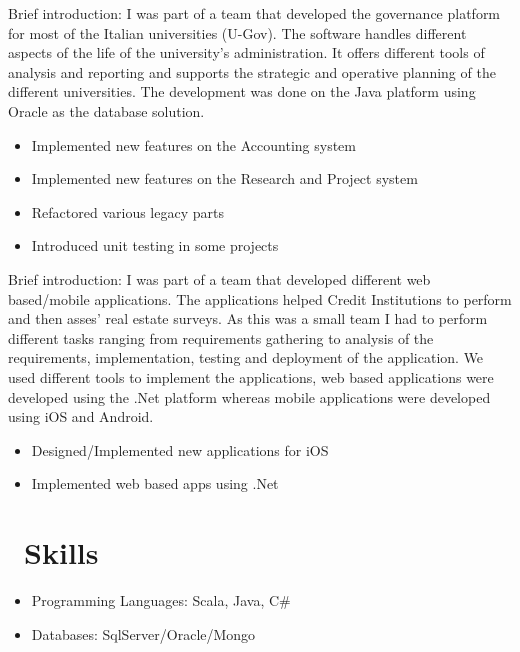 \documentclass{resume}
\begin{document}
Brief introduction:
I was part of a team that developed the governance platform for most of the Italian universities (U-Gov).
The software handles different aspects of the life of the university's administration. It offers different tools of analysis and reporting and supports the strategic and operative planning of the different universities.
The development was done on the Java platform using Oracle as the database solution.

\begin{itemize}
  \item Implemented new features on the Accounting system
  \item Implemented new features on the Research and Project system
  \item Refactored various legacy parts
  \item Introduced unit testing in some projects
\end{itemize}

Brief introduction: I was part of a team that developed different web based/mobile applications.
The applications helped Credit Institutions to perform and then asses’ real estate surveys.
As this was a small team I had to perform different tasks ranging from requirements gathering to analysis of the requirements, implementation, testing and deployment of the application.
We used different tools to implement the applications, web based applications were developed using the .Net platform whereas mobile applications were developed using iOS and Android.

\begin{itemize}
  \item Designed/Implemented new applications for iOS
  \item Implemented web based apps using .Net
\end{itemize}


\section{\faCogs\ Skills}
\begin{itemize}[parsep=0.5ex]
  \item Programming Languages: Scala, Java, C#
  \item Databases: SqlServer/Oracle/Mongo
\end{itemize}
\end{document}

